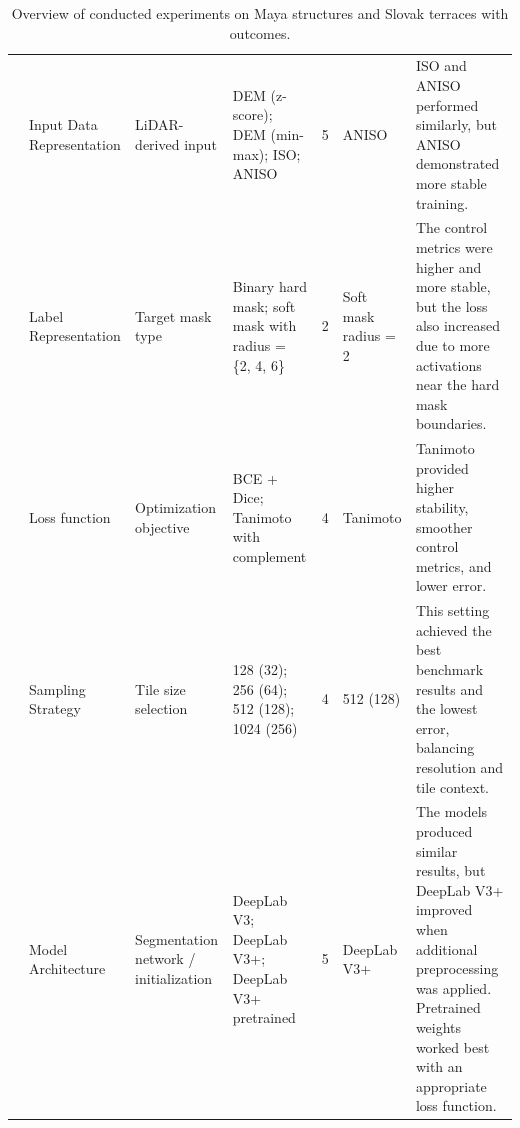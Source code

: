 \begin{landscape}
\begin{table}[p]
\begin{tabularx}{\linewidth}{
@{}
p{0.9cm}
p{2.6cm}
p{3.0cm}
p{4.4cm}
p{1.5cm}
p{3.0cm}
Y
@{}
}
\midrule

& Input Data Representation
& LiDAR-derived input
& DEM (z-score); DEM (min-max); ISO; ANISO
& 5
& ANISO
& ISO and ANISO performed similarly, but ANISO demonstrated more stable training. \\

& Label Representation
& Target mask type
& Binary hard mask; soft mask with radius = \{2, 4, 6\}
& 2
& Soft mask radius = 2
& The control metrics were higher and more stable, but the loss also increased due to more activations near the hard mask boundaries. \\

& Loss function
& Optimization objective
& BCE + Dice; Tanimoto with complement
& 4
& Tanimoto
& Tanimoto provided higher stability, smoother control metrics, and lower error. \\

& Sampling Strategy
& Tile size selection
& 128 (32); 256 (64); 512 (128); 1024 (256)
& 4
& 512 (128)
& This setting achieved the best benchmark results and the lowest error, balancing resolution and tile context. \\

& Model Architecture
& Segmentation network / initialization
& DeepLab V3; DeepLab V3+; DeepLab V3+ pretrained
& 5
& DeepLab V3+
& The models produced similar results, but DeepLab V3+ improved when additional preprocessing was applied. Pretrained weights worked best with an appropriate loss function. \\

\bottomrule
\end{tabularx}

\caption{Overview of conducted experiments on Maya structures and Slovak terraces with outcomes.}
\label{app:tab:experiments_summary}
\end{table}
\end{landscape}
